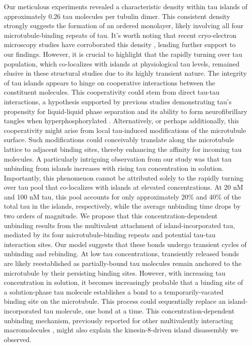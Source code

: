 Our meticulous experiments revealed a characteristic density within tau islands of approximately 0.26 tau molecules per tubulin dimer. This consistent density strongly suggests the formation of an ordered monolayer, likely involving all four microtubule-binding repeats of tau. It's worth noting that recent cryo-electron microscopy studies have corroborated this density \parencite{Kellogg2018}, lending further support to our findings. However, it is crucial to highlight that the rapidly turning over tau population, which co-localizes with islands at physiological tau levels, remained elusive in these structural studies due to its highly transient nature.
The integrity of tau islands appears to hinge on cooperative interactions between the constituent molecules. This cooperativity could stem from direct tau-tau interactions, a hypothesis supported by previous studies demonstrating tau's propensity for liquid-liquid phase separation \parencite{HERNANDEZVEGA20172304} and its ability to form neurofibrillary tangles when hyperphosphorylated \parencite{iqbal2016tau}. Alternatively, or perhaps additionally, this cooperativity might arise from local tau-induced modifications of the microtubule surface. Such modifications could conceivably translate along the microtubule lattice to adjacent binding sites, thereby enhancing the affinity for incoming tau molecules.
A particularly intriguing observation from our study was that tau unbinding from islands increases with rising tau concentration in solution. Importantly, this phenomenon cannot be attributed solely to the rapidly turning over tau pool that co-localizes with islands at elevated concentrations. At 20 nM and 100 nM tau, this pool accounts for only approximately 20\% and 40\% of the total tau in the islands, respectively, while the average unbinding time drops by two orders of magnitude. We propose that this concentration-dependent unbinding results from the multivalent attachment of island-incorporated tau, mediated by its four microtubule-binding repeats and potential tau-tau interaction sites.
Our model suggests that these bonds undergo transient cycles of unbinding and rebinding. At low tau concentrations, transiently released bonds are likely reestablished as partially-bound tau molecules remain anchored to the microtubule by their persisting binding sites. However, with increasing tau concentration in solution, it becomes increasingly probable that a binding site of a solution-phase tau molecule establishes a bond to a temporarily-vacated binding site on the microtubule. This process could sequentially replace an island-incorporated tau molecule, one bond at a time. This concentration-dependent unbinding mechanism, previously reported for other multivalently interacting macromolecules \parencite{lanskydiffusible2015, sing2014multiple}, might also explain the kinesin-8-driven island disassembly we observed.
